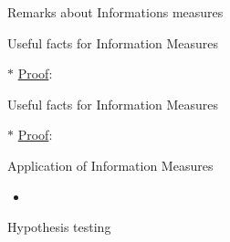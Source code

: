 \documentclass[9pt]{beamer}
\begin{document}
    \begin{section}{Remarks about Informations measures}
        \begin{frame}{Useful facts for Information Measures}
            \begin{theorem}
                
            \end{theorem}
            
            $\ast$ \underline{Proof}:
        
        \end{frame}

        \begin{frame}{Useful facts for Information Measures}
            \begin{theorem}
                
            \end{theorem}
            
            \begin{theorem}
                
            \end{theorem}
            
            $\ast$ \underline{Proof}:
        
        \end{frame}

        \begin{frame}{Application of Information Measures}
            \begin{itemize}
                \item 
            \end{itemize}
            
            \begin{block}{Hypothesis testing}
                
            \end{block}
        
        \end{frame}
    \end{section}
\end{document}
